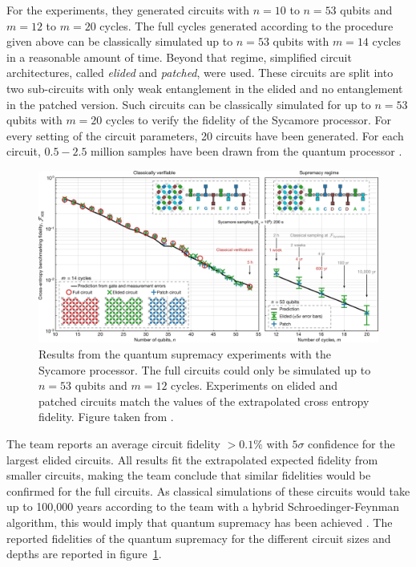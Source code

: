 For the experiments, they generated circuits with $n=10$ to $n=53$ qubits and
$m=12$ to $m=20$ cycles. The full cycles generated according to the procedure
given above can be classically simulated up to $n=53$ qubits with $m=14$ cycles
in a reasonable amount of time. Beyond that regime, simplified circuit
architectures, called \textit{elided} and \textit{patched}, were used. These circuits
are split into two sub-circuits with only weak entanglement in the elided and no
entanglement in the patched version. Such circuits can be classically simulated for up to $n=53$ qubits with $m=20$ cycles to
verify the fidelity of the Sycamore processor. For every setting of the circuit parameters, 20
circuits have been generated. For each circuit, $0.5-2.5$ million samples have been drawn
from the quantum processor \cite{martines2019supremacy}.

\begin{figure}[H]
  \centering
  \includegraphics[width=\textwidth]{figures/supremacy_results}
  \caption[Cross Entropy Fidelity of the Sycamore Processor]{Results from the quantum supremacy experiments 
  with the Sycamore processor. The full circuits could only be simulated up to $n=53$ qubits and 
  $m=12$ cycles. Experiments on elided and patched circuits match the values of the extrapolated cross entropy fidelity.
  Figure taken from \cite{martines2019supremacy}.}
  \label{fig:supremacy_results}
\end{figure}

The team reports an average circuit fidelity $ > 0.1\%$ with $5\sigma$ confidence
for the largest elided circuits. All results fit the extrapolated expected
fidelity from smaller circuits, making the team conclude that similar fidelities
would be confirmed for the full circuits. As classical simulations of these
circuits would take up to 100,000 years according to the team with a hybrid
Schroedinger-Feynman algorithm, this would imply
that quantum supremacy has been achieved \cite{martines2019supremacy}. The reported fidelities of the quantum supremacy for
the different circuit sizes and depths are reported in figure~\ref{fig:supremacy_results}.

